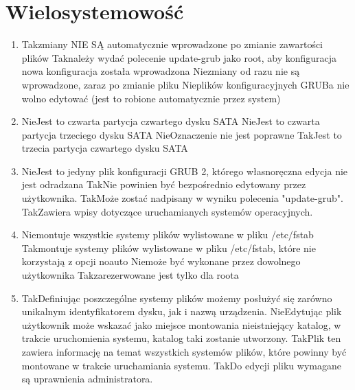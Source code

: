 \newpage
\section{Wielosystemowość}
\begin{enumerate}

	\item {}
	{Tak}{zmiany NIE SĄ automatycznie wprowadzone po zmianie zawartości plików}
	{Tak}{należy wydać polecenie update-grub jako root, aby konfiguracja nowa konfiguracja została wprowadzona}
	{Nie}{zmiany od razu nie są wprowadzone, zaraz po zmianie pliku}
	{Nie}{plików konfiguracyjnych GRUBa nie wolno edytować (jest to robione automatycznie przez system)}
	
	\item {}
	{Nie}{Jest to czwarta partycja czwartego dysku SATA}
	{Nie}{Jest to czwarta partycja trzeciego dysku SATA}
	{Nie}{Oznaczenie nie jest poprawne}
	{Tak}{Jest to trzecia partycja czwartego dysku SATA}
	
	\item {}
	{Nie}{Jest to jedyny plik konfiguracji GRUB 2, którego własnoręczna edycja nie jest odradzana}
	{Tak}{Nie powinien być bezpośrednio edytowany przez użytkownika.}
	{Tak}{Może zostać nadpisany w wyniku polecenia "update-grub".}
	{Tak}{Zawiera wpisy dotyczące uruchamianych systemów operacyjnych.}
	
	\item {}
	{Nie}{montuje wszystkie systemy plików wylistowane w pliku /etc/fstab}
	{Tak}{montuje systemy plików wylistowane w pliku /etc/fstab, które nie korzystają z opcji noauto}
	{Nie}{może być wykonane przez dowolnego użytkownika}
	{Tak}{zarezerwowane jest tylko dla roota}
	
	\item {}
	{Tak}{Definiując poszczególne systemy plików możemy posłużyć się zarówno unikalnym identyfikatorem dysku, jak i nazwą urządzenia.}
	{Nie}{Edytując plik użytkownik może wskazać jako miejsce montowania nieistniejący katalog, w trakcie uruchomienia systemu, katalog taki zostanie utworzony.}
	{Tak}{Plik ten zawiera informację na temat wszystkich systemów plików, które powinny być montowane w trakcie uruchamiania systemu.}
	{Tak}{Do edycji pliku wymagane są uprawnienia administratora.}
	

\end{enumerate}
